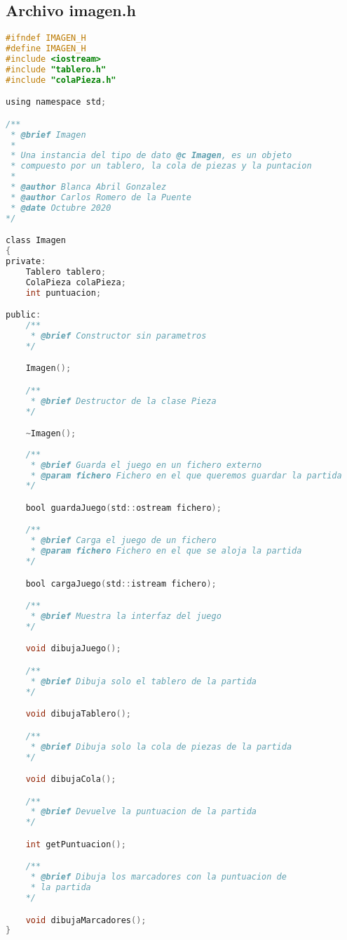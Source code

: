 \documentclass[12pt, spanish]{article}
\begin{document}
\pagebreak

\subsection{Archivo imagen.h }
\begin{lstlisting}[language=C]
#ifndef IMAGEN_H
#define IMAGEN_H
#include <iostream>
#include "tablero.h"
#include "colaPieza.h"

using namespace std;

/**
 * @brief Imagen
 *
 * Una instancia del tipo de dato @c Imagen, es un objeto
 * compuesto por un tablero, la cola de piezas y la puntacion
 *
 * @author Blanca Abril Gonzalez
 * @author Carlos Romero de la Puente
 * @date Octubre 2020
*/

class Imagen
{
private:
	Tablero tablero;
	ColaPieza colaPieza;
	int puntuacion;

public:
	/**
	 * @brief Constructor sin parametros
	*/

	Imagen();

	/**
	 * @brief Destructor de la clase Pieza
	*/

	~Imagen();
	
	/**
	 * @brief Guarda el juego en un fichero externo
	 * @param fichero Fichero en el que queremos guardar la partida
	*/

	bool guardaJuego(std::ostream fichero);

	/**
	 * @brief Carga el juego de un fichero
	 * @param fichero Fichero en el que se aloja la partida
	*/

	bool cargaJuego(std::istream fichero);

	/**
	 * @brief Muestra la interfaz del juego
	*/

	void dibujaJuego();

	/**
	 * @brief Dibuja solo el tablero de la partida
	*/

	void dibujaTablero();

	/**
	 * @brief Dibuja solo la cola de piezas de la partida
	*/

	void dibujaCola();

	/**
	 * @brief Devuelve la puntuacion de la partida
	*/

	int getPuntuacion();

	/**
	 * @brief Dibuja los marcadores con la puntuacion de 
	 * la partida
	*/

	void dibujaMarcadores();
}

\end{lstlisting}
\end{document}
